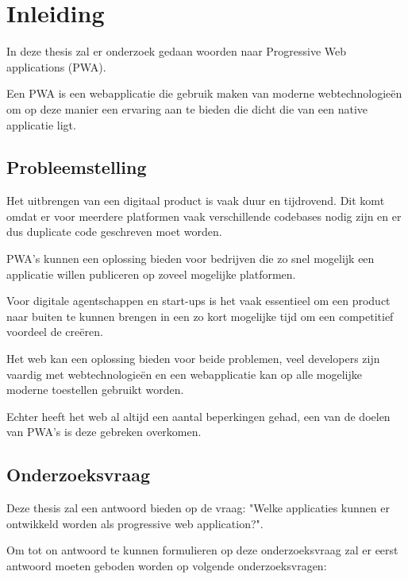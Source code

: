 
\chapter{Inleiding}
\label{ch:inleiding}

In deze thesis zal er onderzoek gedaan woorden naar Progressive Web applications (PWA).

Een PWA is een webapplicatie die gebruik maken van moderne webtechnologieën om op deze manier een ervaring aan te bieden die dicht die van een native applicatie ligt.

\section{Probleemstelling}

	Het uitbrengen van een digitaal product is vaak duur en tijdrovend. Dit komt omdat er voor meerdere platformen vaak verschillende codebases nodig zijn en er dus duplicate code geschreven moet worden. 
	
	PWA's kunnen een oplossing bieden voor bedrijven die zo snel mogelijk een applicatie willen publiceren op zoveel mogelijke platformen.
	
	Voor digitale agentschappen en start-ups is het vaak essentieel om een product naar buiten te kunnen brengen in een zo kort mogelijke tijd om een competitief voordeel de creëren. 
	
	Het web kan een oplossing bieden voor beide problemen, veel developers zijn vaardig met webtechnologieën en een webapplicatie kan op alle mogelijke moderne toestellen gebruikt worden. 
	
	Echter heeft het web al altijd een aantal beperkingen gehad, een van de doelen van PWA's is deze gebreken overkomen.


\section{Onderzoeksvraag}


	Deze thesis zal een antwoord bieden op de vraag: "Welke applicaties kunnen er ontwikkeld worden als progressive web application?".
	
	Om tot on antwoord  te kunnen formulieren op deze onderzoeksvraag zal er eerst antwoord moeten geboden worden op volgende onderzoeksvragen:
	
